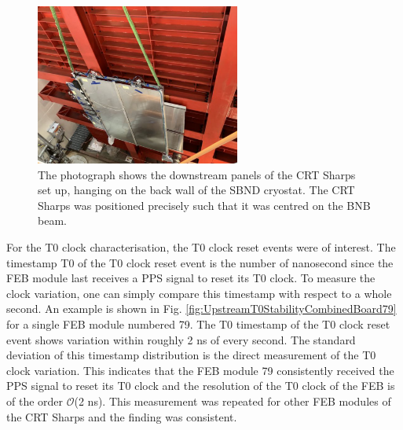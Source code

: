 \begin{figure}[htbp!] 
\centering    
\includegraphics[width=0.6\textwidth]{crt_sharps}
\caption[crtSharps]{
The photograph shows the downstream panels of the CRT Sharps set up, hanging on the back wall of the SBND cryostat. 
The CRT Sharps was positioned precisely such that it was centred on the BNB beam.
}
\label{fig:crtSharps}
\end{figure}

For the T0 clock characterisation, the T0 clock reset events were of interest.
The timestamp T0 of the T0 clock reset event is the number of nanosecond since the FEB module last receives a PPS signal to reset its T0 clock.
To measure the clock variation, one can simply compare this timestamp with respect to a whole second.
An example is shown in Fig. \ref{fig:UpstreamT0StabilityCombinedBoard79} for a single FEB module numbered 79.
The T0 timestamp of the T0 clock reset event shows variation within roughly 2 ns of every second. 
The standard deviation of this timestamp distribution is the direct measurement of the T0 clock variation.
This indicates that the FEB module 79 consistently received the PPS signal to reset its T0 clock and the resolution of the T0 clock of the FEB is of the order $\mathcal{O}$(2 ns).
This measurement was repeated for other FEB modules of the CRT Sharps and the finding was consistent.


